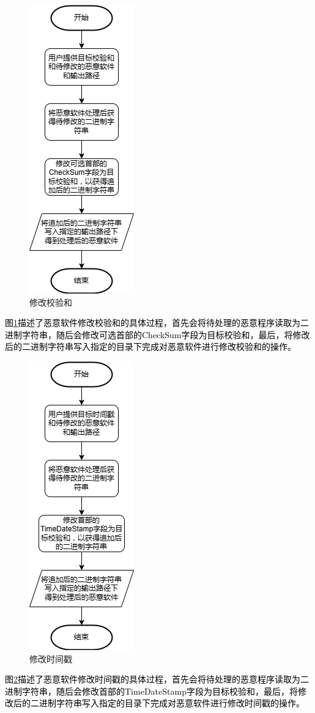 \begin{figure}
  \centering
  \includegraphics[]{images/modify_checksum.png}
  \caption{修改校验和}\label{fig:modify_checksum}
\end{figure}
\textcolor{black}{图\ref{fig:modify_checksum}描述了恶意软件修改校验和的具体过程，首先会将待处理的恶意程序读取为二进制字符串，随后会修改可选首部的CheckSum字段为目标校验和，最后，将修改后的二进制字符串写入指定的目录下完成对恶意软件进行修改校验和的操作。}

\begin{figure}
  \centering
  \includegraphics[]{images/modify_timestamp.png}
  \caption{修改时间戳}\label{fig:modify_timestamp}
\end{figure}
\textcolor{black}{图\ref{fig:modify_timestamp}描述了恶意软件修改时间戳的具体过程，首先会将待处理的恶意程序读取为二进制字符串，随后会修改首部的TimeDateStamp字段为目标校验和，最后，将修改后的二进制字符串写入指定的目录下完成对恶意软件进行修改时间戳的操作。}

